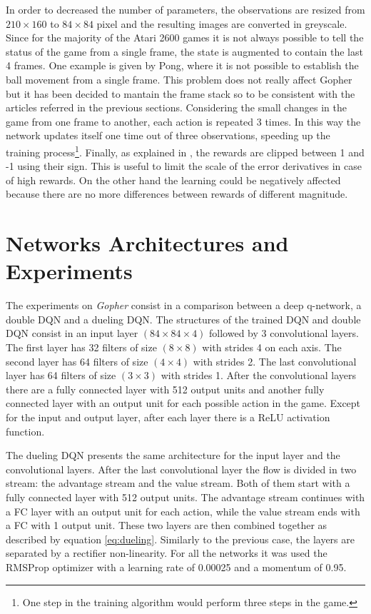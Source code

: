 \documentclass[article,11pt]{article}
\begin{document}
	In order to decreased the number of parameters, the observations are resized from $210\times160$ to $84\times84$ pixel  and the resulting images are converted in greyscale.
	Since for the majority of the Atari 2600 games it is not always possible to tell the status of the game from a single frame, the state is augmented to contain the last 4 frames. One example is given by Pong, where it is not possible to establish the ball movement from a single frame. This problem does not really affect Gopher but it has been decided to mantain the frame stack so to be consistent with the articles referred in the previous sections.
	Considering the small changes in the game from one frame to another, each action is repeated 3 times. In this way the network updates itself one time out of three observations, speeding up the training process\footnote{One step in the training algorithm would perform three steps in the game.}.
	Finally, as explained in \cite{dqn2013}, the rewards are clipped between 1 and -1 using their sign. This is useful to limit the scale of the error derivatives in case of high rewards. On the other hand the learning could be negatively affected because there are no more differences between rewards of different magnitude.
	
	
	\section{Networks Architectures and Experiments}
	The experiments on \textit{Gopher} consist in a comparison between a deep q-network, a double DQN and a dueling DQN. The structures of the trained DQN and double DQN consist in an input layer $(84\times84\times4)$ followed by 3 convolutional layers. The first layer has 32 filters of size $(8\times8)$ with strides 4 on each axis. The second layer has 64 filters of size $(4\times4)$ with strides 2. The last convolutional layer has 64 filters  of size $(3\times3)$ with strides 1. After the convolutional layers there are a fully connected layer with 512 output units and another fully connected layer with an output unit for each possible action in the game. Except for the input and output layer, after each layer there is a ReLU activation function.
	
	The dueling DQN presents the same architecture for the input layer and the convolutional layers. After the last convolutional layer the flow is divided in two stream: the advantage stream and the value stream. Both of them start with a fully connected layer with 512 output units. The advantage stream continues with a FC layer with an output unit for each action, while the value stream ends with a FC with 1 output unit. These two layers are then combined together as described by equation \ref{eq:dueling}. Similarly to the previous case, the layers are separated by a rectifier non-linearity.
	For all the networks it was used the RMSProp optimizer with a learning rate of 0.00025 and a momentum of 0.95.
	
\end{document}
